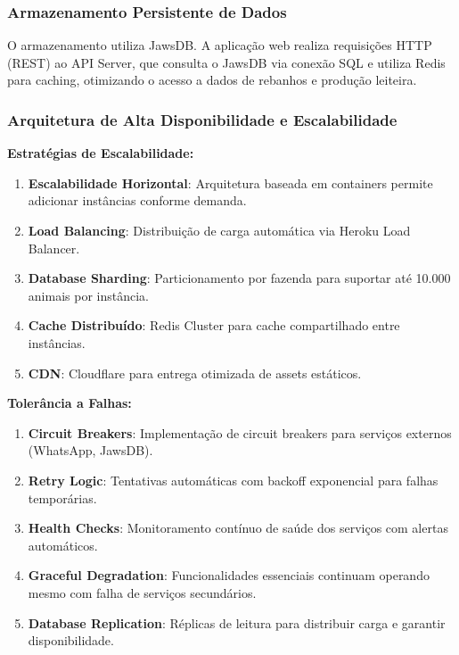 \documentclass[12pt, a4paper]{article}
\begin{document}
\subsubsection{Armazenamento Persistente de Dados}
\begin{spacing}{1.5}
O armazenamento utiliza JawsDB. A aplicação web realiza requisições HTTP (REST) ao API Server, que consulta o JawsDB via conexão SQL e utiliza Redis para caching, otimizando o acesso a dados de rebanhos e produção leiteira.
\end{spacing}

\subsubsection{Arquitetura de Alta Disponibilidade e Escalabilidade}
\begin{spacing}{1.5}
\textbf{Estratégias de Escalabilidade:}
\begin{enumerate}[label=\alph*)]
\item \textbf{Escalabilidade Horizontal}: Arquitetura baseada em containers permite adicionar instâncias conforme demanda.
\item \textbf{Load Balancing}: Distribuição de carga automática via Heroku Load Balancer.
\item \textbf{Database Sharding}: Particionamento por fazenda para suportar até 10.000 animais por instância.
\item \textbf{Cache Distribuído}: Redis Cluster para cache compartilhado entre instâncias.
\item \textbf{CDN}: Cloudflare para entrega otimizada de assets estáticos.
\end{enumerate}

\textbf{Tolerância a Falhas:}
\begin{enumerate}[label=\alph*)]
\item \textbf{Circuit Breakers}: Implementação de circuit breakers para serviços externos (WhatsApp, JawsDB).
\item \textbf{Retry Logic}: Tentativas automáticas com backoff exponencial para falhas temporárias.
\item \textbf{Health Checks}: Monitoramento contínuo de saúde dos serviços com alertas automáticos.
\item \textbf{Graceful Degradation}: Funcionalidades essenciais continuam operando mesmo com falha de serviços secundários.
\item \textbf{Database Replication}: Réplicas de leitura para distribuir carga e garantir disponibilidade.
\end{enumerate}


\end{spacing}
\end{document}
